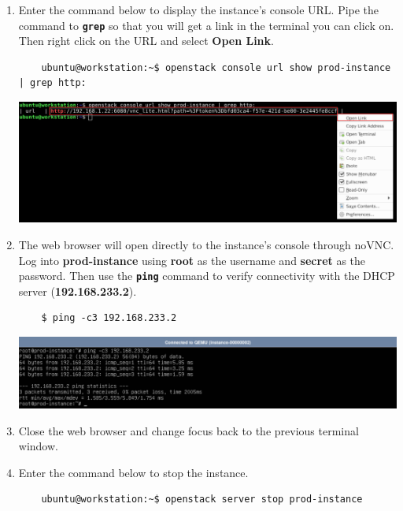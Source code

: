 \documentclass[letterpaper, 12pt]{article}
\begin{document}
\begin{enumerate}
    \item Enter the command below to display the instance's console URL. Pipe the command to \textbf{\texttt{grep}} so
    that you will get a link in the terminal you can click on. Then right click on the URL and select \textbf{Open
    Link}.
    \begin{lstlisting}
    ubuntu@workstation:~$ openstack console url show prod-instance | grep http:
    \end{lstlisting}

    \begin{center}
        \includegraphics[width=\linewidth]{images/part2/step15.png}
    \end{center}

    \item The web browser will open directly to the instance's console through noVNC. Log into \textbf{prod-instance}
    using \textbf{root} as the username and \textbf{secret} as the password. Then use the \textbf{\texttt{ping}}
    command to verify connectivity with the DHCP server (\textbf{192.168.233.2}).
    \begin{lstlisting}
    $ ping -c3 192.168.233.2
    \end{lstlisting}

    \begin{center}
        \includegraphics[width=\linewidth]{images/part2/step16.png}
    \end{center}

    \item Close the web browser and change focus back to the previous terminal window.
    
    \item Enter the command below to stop the instance.
    \begin{lstlisting}
    ubuntu@workstation:~$ openstack server stop prod-instance
    \end{lstlisting}


\end{enumerate}
\end{document}
